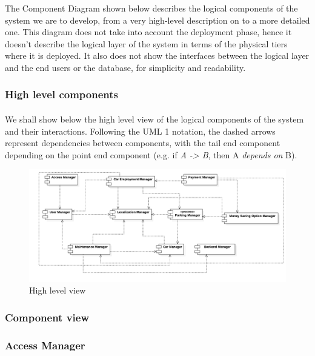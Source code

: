 The Component Diagram shown below describes the logical components of the system we are to develop, from a very high-level description on to a more detailed one. This diagram does not take into account the deployment phase, hence it doesn't describe the logical layer of the system in terms of the physical tiers where it is deployed. It also does not show the interfaces between the logical layer and the end users or the database, for simplicity and readability. 


	\subsubsection{High level components}
		\paragraph{} We shall show below the high level view of the logical components of the system and their interactions. Following the UML 1 notation, the dashed arrows represent dependencies between components, with the tail end component depending on the point end component (e.g. if \textit{A -> B}, then A \textit{depends on} B). 

		
		\begin{figure}[h]
			\includegraphics[scale=0.26, center]{img/component_diagrams/01_high_level_component_view.png}
			\caption{High level view}
		\end{figure}
\FloatBarrier


	\subsubsection{Component view}
	
	\subsubsection*{Access Manager}
		
